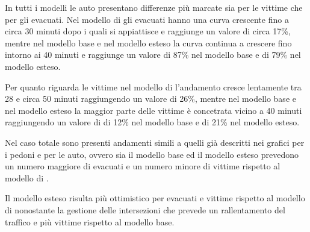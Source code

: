 In tutti i modelli le auto presentano differenze più marcate sia per le vittime che per gli evacuati.
Nel modello di \textcite{wang2021novel} gli evacuati hanno una curva crescente fino a circa 30 minuti dopo i quali si appiattisce e raggiunge un valore di circa 17\%,
mentre nel modello base e nel modello esteso la curva continua a crescere fino intorno ai 40 minuti e raggiunge un valore di 87\% nel modello base e di 79\% nel modello esteso.

Per quanto riguarda le vittime nel modello di \textcite{wang2021novel} l'andamento cresce lentamente tra 28 e circa 50 minuti raggiungendo un valore di 26\%, mentre nel
modello base e nel modello esteso la maggior parte delle vittime è concetrata vicino a 40 minuti raggiungendo un valore di di 12\% nel modello base e di 21\% nel modello esteso.

Nel caso totale sono presenti andamenti simili a quelli già descritti nei grafici per i pedoni e per le auto, ovvero sia il modello base ed il modello esteso
prevedono un numero maggiore di evacuati e un numero minore di vittime rispetto al modello di \textcite{wang2021novel}.

Il modello esteso risulta più ottimistico per evacuati e vittime rispetto al modello di \textcite{wang2021novel} nonostante la gestione delle intersezioni
che prevede un rallentamento del traffico e più vittime rispetto al modello base.


